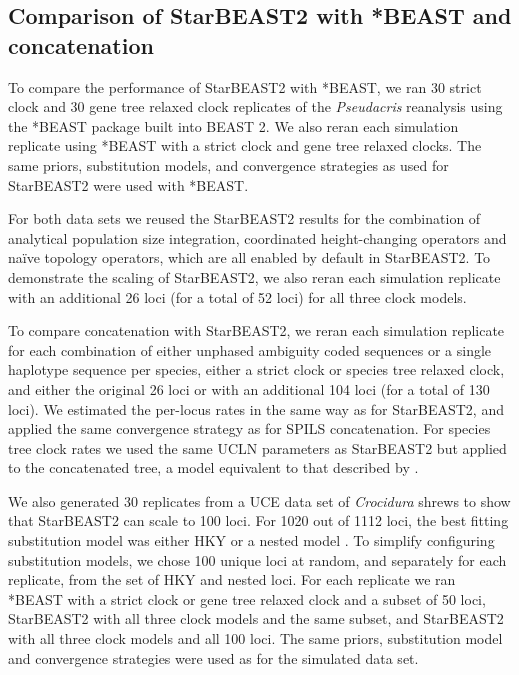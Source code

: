 \documentclass[nogrid]{MBE}%
\begin{document}
\subsection{Comparison of StarBEAST2 with *BEAST and concatenation}

To compare the performance of StarBEAST2 with *BEAST, we ran 30 strict clock
and 30 gene tree relaxed clock replicates of the \textit{Pseudacris}
reanalysis using the *BEAST package built into BEAST 2. We also reran each
simulation replicate using *BEAST with a strict clock and gene tree relaxed
clocks. The same priors, substitution models, and convergence strategies as
used for StarBEAST2 were used with *BEAST.

For both data sets we reused the StarBEAST2 results for the combination of
analytical population size integration, coordinated height-changing operators
and na\"ive topology operators, which are all enabled by default in
StarBEAST2. To demonstrate the scaling of StarBEAST2, we also reran each
simulation replicate with an additional 26 loci (for a total of 52 loci) for
all three clock models.

To compare concatenation with StarBEAST2, we reran each simulation replicate
for each combination of either unphased ambiguity coded sequences or a single
haplotype sequence per species, either a strict clock or species tree relaxed
clock, and either the original 26 loci or with an additional 104 loci (for a
total of 130 loci). We estimated the per-locus rates in the same way as for
StarBEAST2, and applied the same convergence strategy as for SPILS
concatenation. For species tree clock rates we used the same UCLN parameters
as StarBEAST2 but applied to the concatenated tree, a model equivalent to that
described by \cite{Rasmussen01122007}.

We also generated 30 replicates from a UCE data set of \textit{Crocidura}
shrews to show that StarBEAST2 can scale to 100 loci. For 1020 out of 1112
loci, the best fitting substitution model was either HKY or a nested model
\citep{Giarla01092015}. To simplify configuring substitution models, we chose
100 unique loci at random, and separately for each replicate, from the set of HKY
and nested loci. For each replicate we ran *BEAST with a strict clock or gene
tree relaxed clock and a subset of 50 loci, StarBEAST2 with all three clock
models and the same subset, and StarBEAST2 with all three clock models and all
100 loci. The same priors, substitution model and convergence strategies were
used as for the simulated data set.
\end{document}
